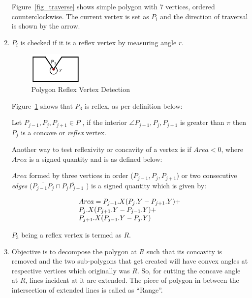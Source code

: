 \begin{enumerate}
Figure~\ref{fig_traverse} shows simple polygon with 7 vertices, ordered counterclockwise. The current vertex is set as $P_i$  and the direction of traversal is shown by the arrow.

\item 
$P_i$ is checked if it is a reflex vertex by measuring angle $r$.


\begin{figure}[h]
\centering \includegraphics[width=0.3\linewidth]{../Common/images/polydecomp_reflex_1.pdf} 
\caption{Polygon Reflex Vertex Detection}
\label{fig_reflex}
\end{figure}


Figure~\ref{fig_reflex} shows that $P_3$ is reflex, as per definition below:

Let  $ P_{j-1}, P_j,  P_{j+1} \in P $ , if the interior $\angle P_{j-1}, P_j,  P_{j+1}$ is greater than $\pi$  then $P_j$  is a concave or {\em reflex} vertex.

Another way to test reflexivity or concavity of a vertex is if $Area < 0$, where $Area$ is a signed quantity and is as defined below:

$Area$ formed by three vertices in order ($ P_{j-1}, P_j,  P_{j+1}$) or two consecutive {\em edges} ($ \overline{P_{j-1} P_j} \cap \overline{P_j P_{j+1}}$ ) is a signed quantity which is given by:

\begin{displaymath}
\begin{array}{l l}
Area = P_{j-1}.X ( P_j.Y - P_{j+1}.Y) + \\
P_j.X (P_{j+1}.Y -  P_{j-1}.Y) + \\
P_{j+1}.X ( P_{j-1}.Y - P_j.Y) 
 \end{array} 
\end{displaymath}

$P_3$ being a reflex vertex is termed as $R$.

\item 
Objective is to decompose the polygon at $R$ such that its concavity is removed and the two sub-polygons that get created will have convex angles at respective vertices which originally was $R$. So, for cutting the concave angle at $R$, lines incident at it are extended. The piece of polygon in between the intersection of extended lines is called as ``Range''. 


\end{enumerate}
